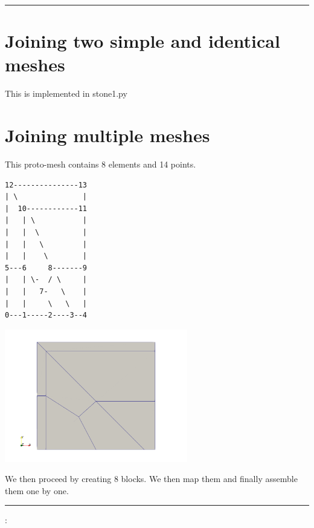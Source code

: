 \par\noindent\rule{\textwidth}{0.4pt}


\section*{Joining two simple and identical meshes}

This is implemented in { stone1.py}

\section*{Joining multiple meshes}

This proto-mesh contains 8 elements and 14 points.

\begin{verbatim}
12---------------13
| \               |
|  10------------11
|   | \           |
|   |  \          |
|   |   \         |
|   |    \        |
5---6     8-------9       
|   | \-  / \     |
|   |   7-   \    |
|   |     \   \   |
0---1-----2----3--4
\end{verbatim}

\includegraphics[width=8cm]{python_codes/fieldstone_149/mesh}

We then proceed by creating 8 blocks. We then map them and finally 
assemble them one by one.



\par\noindent\rule{\textwidth}{0.4pt}

\vspace{.5cm}

\begin{center}
\end{center}

\vspace{.5cm}

\Literature:\\
\\

